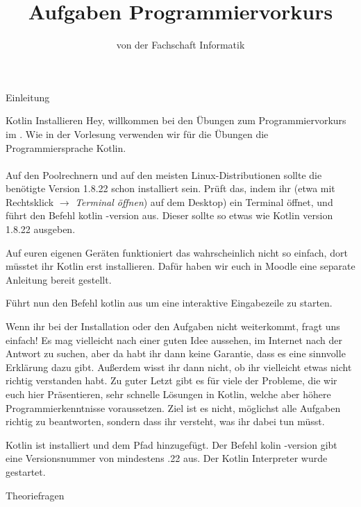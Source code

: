 
\title{Aufgaben Programmiervorkurs}
\subtitle{von der Fachschaft Informatik\hfill\ptitle}

\usepackage{hyperref}
\usepackage{wrapfig}


\maketitle{}

\begin{task}[points=auto]{Einleitung}
    \begin{subtask*}[points=0]{Kotlin Installieren}
        Hey, willkommen bei den Übungen zum Programmiervorkurs im \ptitle. Wie in der
        Vorlesung verwenden wir für die Übungen die Programmiersprache Kotlin. \\\\
        Auf den Poolrechnern und auf den meisten Linux-Distributionen sollte die
        benötigte Version 1.8.22 schon installiert sein. Prüft das, indem ihr (etwa mit
        Rechtsklick $\to$ \textit{Terminal öffnen}) auf dem Desktop) ein Terminal öffnet,
        und führt den Befehl {\ttfamily kotlin -version} aus. Dieser sollte so etwas wie
        {\ttfamily Kotlin version 1.8.22} ausgeben.

        Auf euren eigenen Geräten funktioniert das wahrscheinlich nicht so einfach, dort müsstet ihr Kotlin erst installieren.
        Dafür haben wir euch in Moodle eine separate Anleitung bereit gestellt.

        Führt nun den Befehl {\ttfamily kotlin} aus um eine interaktive Eingabezeile zu starten.

        Wenn ihr bei der Installation oder den Aufgaben nicht weiterkommt, fragt uns einfach! Es mag vielleicht nach einer guten Idee aussehen, im Internet nach der Antwort zu suchen, aber da habt ihr dann keine Garantie, dass es eine sinnvolle Erklärung dazu gibt. Außerdem wisst ihr dann nicht, ob ihr vielleicht etwas nicht richtig verstanden habt. Zu guter Letzt gibt es für viele der Probleme, die wir euch hier Präsentieren, sehr schnelle Lösungen in Kotlin, welche aber höhere Programmierkenntnisse voraussetzen. Ziel ist es nicht, möglichst alle Aufgaben richtig zu beantworten, sondern dass ihr versteht, was ihr dabei tun müsst.
        \begin{solution}
            Kotlin ist installiert und dem Pfad hinzugefügt. Der Befehl
            {\ttfamily kolin -version} gibt eine Versionsnummer von mindestens {.22} aus.
            Der Kotlin Interpreter wurde gestartet.
        \end{solution}
    \end{subtask*}
    \begin{subtask*}[points=0]{Theoriefragen}

\end{subtask*}
\end{task}
